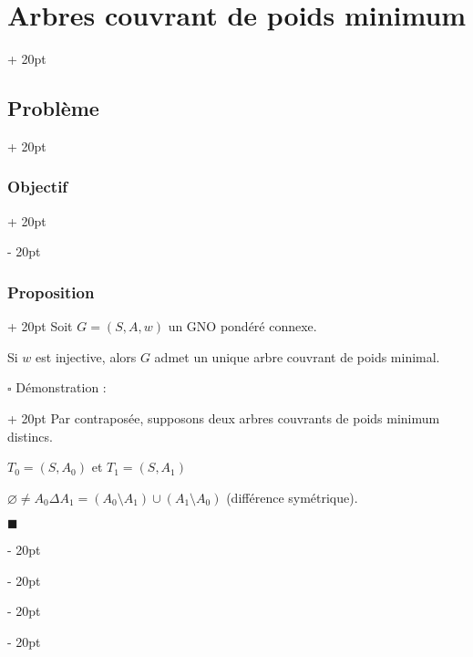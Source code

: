 \documentclass[a4paper, 12pt, twoside]{article}
\newcommand{\ind}[1][20pt]{\advance\leftskip + #1}
\newcommand{\deind}[1][20pt]{\advance\leftskip - #1}
\newenvironment{indt}[2][20pt]{#2 \par \ind[#1]}{\par \deind} %
\newenvironment{proof}[1][{Démonstration :}]{\begin{indt}{$\square$ #1}}{$\blacksquare$ \end{indt}}
\begin{document}
\begin{indt}{\section{Arbres couvrant de poids minimum}}
\begin{indt}{\subsection{Problème}}
\begin{indt}{\subsubsection{Objectif}}
\begin{center}
                \end{center}

                \begin{center}
                \end{center}
            \end{indt}

            \vspace{12pt}
            
            \begin{indt}{\subsubsection{Proposition}}
                Soit $G = (S, A, w)$ un GNO pondéré connexe.

                \begin{pseudocode}
                    Si $w$ est injective, alors $G$ admet un unique arbre couvrant de poids minimal.
                \end{pseudocode}

                \begin{proof}
                    Par contraposée, supposons deux arbres couvrants de poids minimum distincs.

                    $T_0 = (S, A_0)$ et $T_1 = (S, A_1)$

                    $\varnothing \neq A_0 \Delta A_1 = (A_0 \setminus A_1) \cup (A_1 \setminus A_0)$ (différence symétrique).


\end{proof}
\end{indt}
\end{indt}
\end{indt}
\end{document}
